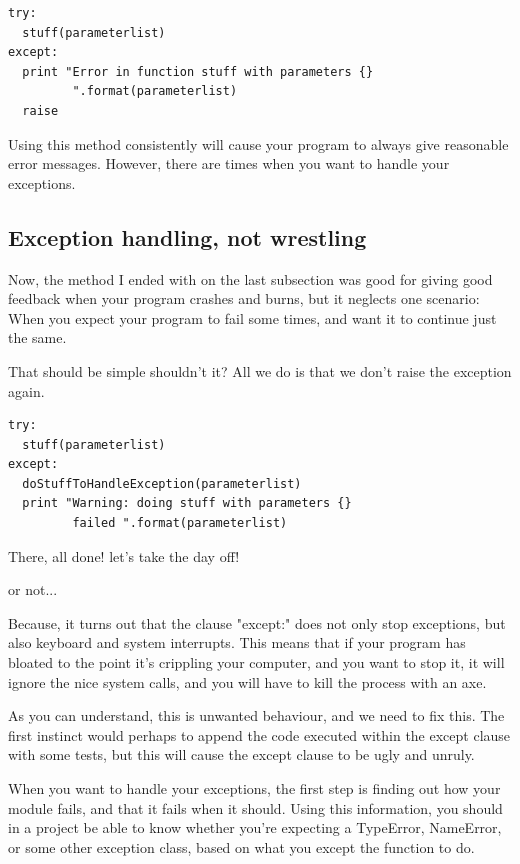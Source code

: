 \documentclass[10pt,a4paper]{article}
\begin{document}
\begin{lstlisting}
try: 
  stuff(parameterlist)
except:
  print "Error in function stuff with parameters {} 
         ".format(parameterlist) 
  raise
\end{lstlisting}

Using this method consistently will cause your program to always give reasonable error messages. However, there are times when you want to handle your exceptions.

\subsection{Exception handling, not wrestling}

Now, the method I ended with on the last subsection was good for giving good feedback when your program crashes and burns, but it neglects one scenario: When you expect your program to fail some times, and want it to continue just the same. 

That should be simple shouldn't it? All we do is that we don't raise the exception again.

\begin{lstlisting}
try: 
  stuff(parameterlist)
except:
  doStuffToHandleException(parameterlist)
  print "Warning: doing stuff with parameters {} 
         failed ".format(parameterlist) 
\end{lstlisting}

There, all done! let's take the day off!

or not...

Because, it turns out that the clause "except:" does 
not only stop exceptions, but also keyboard and system interrupts. 
This means that if your program has bloated to the point it's crippling your computer, and you want to stop it, it will ignore the nice system calls, and you will have to kill the process with an axe.

As you can understand, this is unwanted behaviour, and we need to fix this. The first instinct would perhaps to append the code executed within the except clause with some tests, but this will cause the except clause to be ugly and unruly.

When you want to handle your exceptions, the first step is finding out how your module fails, and that it fails when it should. Using this information, you should in a project be able to know whether you're expecting a TypeError, NameError, or some other exception class, based on what you except the function to do. 
\end{document}
